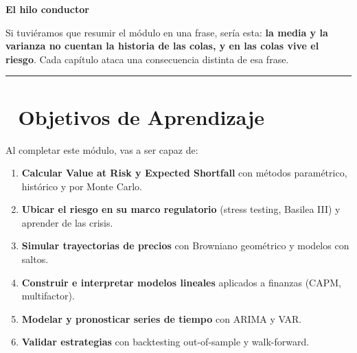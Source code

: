\documentclass[
  spanish,
  letterpaper,
  DIV=11,
  numbers=noendperiod]{scrreprt}
\providecommand{\tightlist}{%
  \setlength{\itemsep}{0pt}\setlength{\parskip}{0pt}}
\begin{document}
\begin{tcolorbox}[enhanced jigsaw, bottomrule=.15mm, colback=white, breakable, left=2mm, colframe=quarto-callout-note-color-frame, leftrule=.75mm, arc=.35mm, toprule=.15mm, rightrule=.15mm, opacityback=0]
\begin{minipage}[t]{5.5mm}
\textcolor{quarto-callout-note-color}{\faInfo}
\end{minipage}%
\begin{minipage}[t]{\textwidth - 5.5mm}

\vspace{-3mm}\textbf{El hilo conductor}\vspace{3mm}

Si tuviéramos que resumir el módulo en una frase, sería esta: \textbf{la
media y la varianza no cuentan la historia de las colas, y en las colas
vive el riesgo}. Cada capítulo ataca una consecuencia distinta de esa
frase.

\end{minipage}%
\end{tcolorbox}

\begin{center}\rule{0.5\linewidth}{0.5pt}\end{center}

\section*{🎯 Objetivos de Aprendizaje}\label{objetivos-de-aprendizaje-2}


Al completar este módulo, vas a ser capaz de:

\begin{enumerate}
\def\labelenumi{\arabic{enumi}.}
\tightlist
\item
  \textbf{Calcular Value at Risk y Expected Shortfall} con métodos
  paramétrico, histórico y por Monte Carlo.
\item
  \textbf{Ubicar el riesgo en su marco regulatorio} (stress testing,
  Basilea III) y aprender de las crisis.
\item
  \textbf{Simular trayectorias de precios} con Browniano geométrico y
  modelos con saltos.
\item
  \textbf{Construir e interpretar modelos lineales} aplicados a finanzas
  (CAPM, multifactor).
\item
  \textbf{Modelar y pronosticar series de tiempo} con ARIMA y VAR.
\item
  \textbf{Validar estrategias} con backtesting out-of-sample y
  walk-forward.
\end{enumerate}
\end{document}
